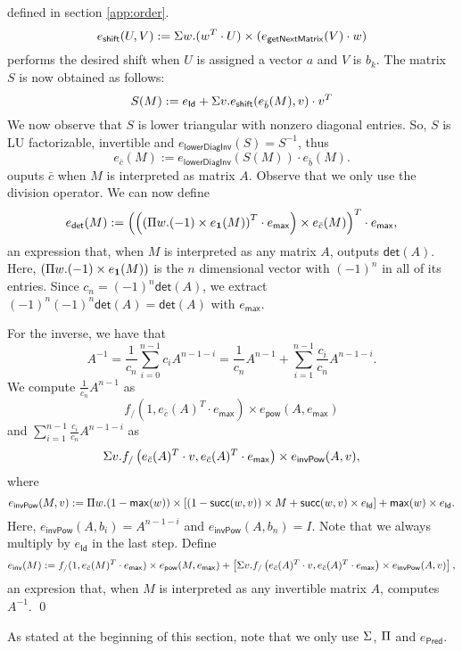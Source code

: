 defined in section \ref{app:order}.
$$
e_{\mathsf{shift}}(U,V):=\Sigma w.(w^T\cdot U)\times(e_{\mathsf{getNextMatrix}}(V)\cdot w)
$$
performs the desired shift when $U$ is assigned a vector $a$ and $V$ is $b_k$. 
The matrix $S$ is now obtained as follows:
$$
S(M):= e_{\mathsf{Id}} + \Sigma v. e_{\mathsf{shift}}(e_{\bar b}(M), v)\cdot v^T
$$
We now observe that $S$ is lower triangular with nonzero diagonal entries. So, $S$ is LU factorizable, invertible
and $e_{\mathsf{lowerDiagInv}}(S)=S^{-1}$, thus
$$
e_{\bar c}(M):=e_{\mathsf{lowerDiagInv}}(S(M))\cdot e_{\bar b}(M).
$$
ouputs $\bar c$ when $M$ is interpreted as matrix $A$. Observe that we only use the division operator.
We can now define
$$
e_{\mathsf{det}}(M):=\left( \left(\left( \Pi w. (-1)\times e_{\mathbf{1}}(M)\right)^T\cdot e_{\mathsf{max}}\right) \times e_{\bar c}(M) \right)^T\cdot e_{\mathsf{max}},
$$
an expression that, when $M$ is interpreted as any matrix $A$, outputs $\mathsf{det}(A)$.
Here, $(\Pi w. (-1)\times e_{\mathbf{1}}(M))$ is the $n$ dimensional vector with $(-1)^n$ in all of its entries.
Since $c_n=(-1)^n\mathsf{det}(A)$, we extract $(-1)^n(-1)^n\mathsf{det}(A)=\mathsf{det}(A)$ with $e_{\mathsf{max}}$.

For the inverse, we have that
$$
A^{-1}=\frac{1}{c_n}\sum_{i=0}^{n-1}c_i A^{n-1-i} = \frac{1}{c_n}A^{n-1} + \sum_{i=1}^{n-1}\frac{c_i}{c_n}A^{n-1-i}.
$$
We compute $\frac{1}{c_n}A^{n-1}$ as
$$
f_{/}(1, e_{\bar c}(A)^T\cdot e_{\mathsf{max}})\times e_{\mathsf{pow}}(A, e_{\mathsf{max}})
$$
and $\sum_{i=1}^{n-1}\frac{c_i}{c_n}A^{n-1-i}$ as
$$
\Sigma v. f_{/}\left( e_{\bar c}(A)^T\cdot v, e_{\bar c}(A)^T\cdot e_{\mathsf{max}} \right)\times e_{\mathsf{invPow}}(A, v),
$$
where
$$
e_{\mathsf{invPow}}(M, v):= \Pi w. (1-\mathsf{max}(w)) \times \left[ (1 - \mathsf{succ}(w,v))\times M + \mathsf{succ}(w,v)\times e_{\mathsf{Id}} \right] + \mathsf{max}(w)\times e_{\mathsf{Id}}.
$$
Here, $e_{\mathsf{invPow}}(A, b_i)=A^{n-1-i}$ and $e_{\mathsf{invPow}}(A, b_n)=I$.
Note that we always multiply by $e_{\mathsf{Id}}$ in the last step.
Define
$$
e_{\mathsf{inv}}(M):= f_{/}(1, e_{\bar c}(M)^T\cdot e_{\mathsf{max}})\times e_{\mathsf{pow}}(M, e_{\mathsf{max}}) + \left[ \Sigma v. f_{/}\left( e_{\bar c}(A)^T\cdot v, e_{\bar c}(A)^T\cdot e_{\mathsf{max}} \right)\times e_{\mathsf{invPow}}(A, v) \right],
$$
an expresion that, when $M$ is interpreted as any invertible matrix $A$, computes $A^{-1}$.
\qed

As stated at the beginning of this section, note that we only use $\Sigma$, $\Pi$ and $e_{\mathsf{Pred}}$.

